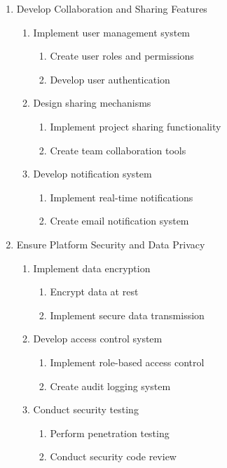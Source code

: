 \documentclass[12pt]{article}
\begin{document}
\begin{enumerate}
    \item Develop Collaboration and Sharing Features
    \begin{enumerate}
        \item Implement user management system
        \begin{enumerate}
            \item Create user roles and permissions
            \item Develop user authentication
        \end{enumerate}
        \item Design sharing mechanisms
        \begin{enumerate}
            \item Implement project sharing functionality
            \item Create team collaboration tools
        \end{enumerate}
        \item Develop notification system
        \begin{enumerate}
            \item Implement real-time notifications
            \item Create email notification system
        \end{enumerate}
    \end{enumerate}

    \item Ensure Platform Security and Data Privacy
    \begin{enumerate}
        \item Implement data encryption
        \begin{enumerate}
            \item Encrypt data at rest
            \item Implement secure data transmission
        \end{enumerate}
        \item Develop access control system
        \begin{enumerate}
            \item Implement role-based access control
            \item Create audit logging system
        \end{enumerate}
        \item Conduct security testing
        \begin{enumerate}
            \item Perform penetration testing
            \item Conduct security code review
        \end{enumerate}
    \end{enumerate}


\end{enumerate}
\end{document}
